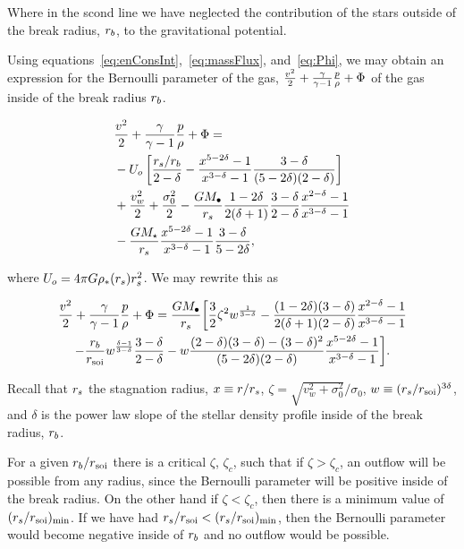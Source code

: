 Where in the scond line we have neglected the contribution of the
stars outside of the break radius, $r_b$, to the gravitational potential.


Using equations~\eqref{eq:enConsInt},~\eqref{eq:massFlux},
and~\eqref{eq:Phi}, we may obtain an expression for the Bernoulli
parameter of the gas, $\frac{v^2}{2}+\frac{\gamma}{\gamma-1} \frac{p}{\rho} +\Phi$ of the gas inside
of the break radius $r_b$.

\begin{align}
  &\frac{v^2}{2}+\frac{\gamma}{\gamma-1} \frac{p}{\rho} +\Phi = \nonumber\\
  &-U_o\left[\frac{r_s/r_b}{2-\delta}-\frac{x^{5-2\delta}-1}{x^{3-\delta}-1}\frac{3-\delta}{(5-2\delta)(2-\delta)}\right]\nonumber\\
  &+\frac{v_w^2}{2}+\frac{\sigma_0^2}{2}- \frac{G M_{\bullet}}{r_s}
  \frac{1-2\delta}{2(\delta+1)} \frac{3-\delta}{2-\delta}\frac{x^{2-\delta}-1}{x^{3-\delta}-1}
  \nonumber\\
  &-\frac{G M_\star}{r_s}
  \frac{x^{5-2\delta}-1}{x^{3-\delta}-1}\frac{3-\delta}{5-2\delta},
\end{align}

where $U_o=4 \pi G \rho_*(r_s) r_s^2$.  We may rewrite this as 

\begin{multline}
  \frac{v^2}{2}+\frac{\gamma}{\gamma-1} \frac{p}{\rho}+\Phi
=\frac{G M_{\bullet}}{r_s} 
\biggl[
  \frac{3}{2} \zeta^2 w^{\frac{1}{3 -\delta}}
  -\frac{(1-2\delta)(3-\delta)}{2(\delta+1)(2-\delta)}  \frac{x^{2  -\delta}-1}{x^{3-\delta}-1}\\
  -\frac{r_b}{r_{\rm soi}} w^{\frac{\delta-1}{3-\delta}} \frac{3 -\delta}{2 -\delta} 
  -w \frac{(2-\delta)(3-\delta)-(3-\delta)^{2}}{(5-2\delta)(2-\delta)} \frac{x^{5-2\delta}-1}{x^{3-\delta}-1}
\biggr].
\label{eq:enthAnal}
\end{multline}

Recall that $r_s$ the stagnation radius, $x\equiv r/r_s$, $\zeta=\sqrt{v_w^2+\sigma_0^2}/\sigma_0$, $w\equiv (r_s/r_{\rm soi})^{3\delta}$, and
$\delta$ is the power law slope of the stellar density profile inside
of the break radius, $r_b$.

 For a given $r_b/r_{\rm soi}$ there is a critical $\zeta$, $\zeta_{c}$, such
 that if $\zeta>\zeta_c$, an outflow will be possible from any
radius, since the Bernoulli parameter will be positive inside of the
break radius. On the other hand if $\zeta<\zeta_c$, then there is a
minimum value of $(r_s/r_{\rm soi})_{\rm min}$. If we have had
$r_s/r_{\rm soi}<(r_s/r_{\rm soi})_{\rm min}$, then the Bernoulli parameter would
become negative inside of $r_b$ and no outflow would be possible.

